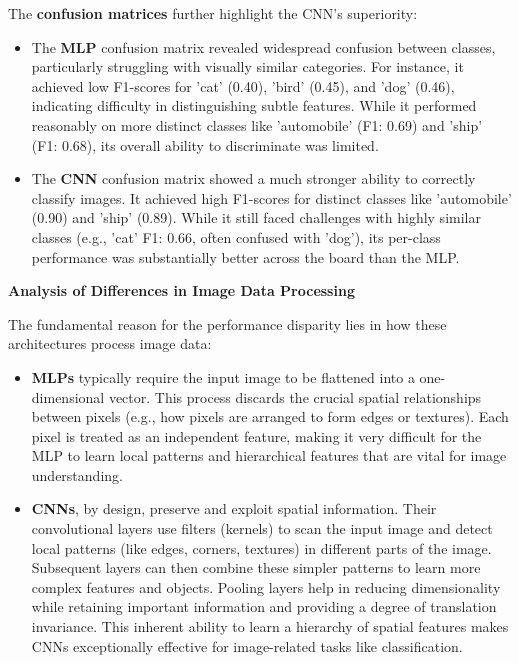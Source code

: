 \documentclass[12pt, a4paper]{report}
\begin{document}
\noindent The \textbf{confusion matrices} further highlight the CNN's superiority:
\begin{itemize}
\item The \textbf{MLP} confusion matrix revealed widespread confusion between classes, particularly struggling with visually similar categories.
For instance, it achieved low F1-scores for 'cat' (0.40), 'bird' (0.45), and 'dog' (0.46), indicating difficulty in distinguishing subtle features.
While it performed reasonably on more distinct classes like 'automobile' (F1: 0.69) and 'ship' (F1: 0.68), its overall ability to discriminate was limited.

\item The \textbf{CNN} confusion matrix showed a much stronger ability to correctly classify images.
It achieved high F1-scores for distinct classes like 'automobile' (0.90) and 'ship' (0.89).
While it still faced challenges with highly similar classes (e.g., 'cat' F1: 0.66, often confused with 'dog'), its per-class performance was substantially better across the board than the MLP.
\end{itemize}
\textbf{Analysis of Differences in Image Data Processing}

The fundamental reason for the performance disparity lies in how these architectures process image data:
\begin{itemize}
    \item \textbf{MLPs} typically require the input image to be flattened into a one-dimensional vector.
    This process discards the crucial spatial relationships between pixels (e.g., how pixels are arranged to form edges or textures).
    Each pixel is treated as an independent feature, making it very difficult for the MLP to learn local patterns and hierarchical features that are vital for image understanding.
    \item \textbf{CNNs}, by design, preserve and exploit spatial information. Their convolutional layers use filters (kernels) to scan the input image and detect local patterns (like edges, corners, textures) in different parts of the image.
    Subsequent layers can then combine these simpler patterns to learn more complex features and objects.
    Pooling layers help in reducing dimensionality while retaining important information and providing a degree of translation invariance.
    This inherent ability to learn a hierarchy of spatial features makes CNNs exceptionally effective for image-related tasks like classification.
\end{itemize}
\end{document}
